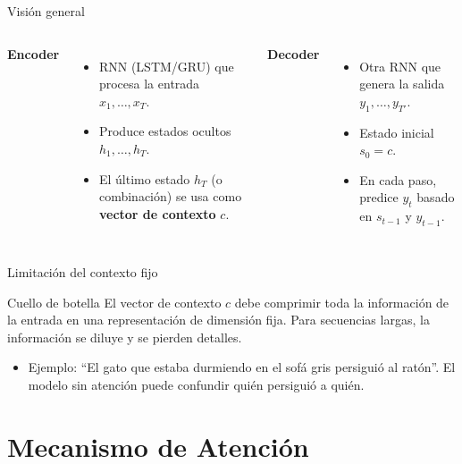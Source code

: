 \documentclass[aspectratio=169, 10pt, xcolor=table]{beamer}
\begin{document}
\begin{frame}{Visión general}
    \begin{columns}[t]
        \textbf{Encoder}
        \begin{itemize}
            \item RNN (LSTM/GRU) que procesa la entrada $x_1,\dots,x_T$.
            \item Produce estados ocultos $h_1,\dots,h_T$.
            \item El último estado $h_T$ (o combinación) se usa como \textbf{vector de contexto} $c$.
        \end{itemize}
        \textbf{Decoder}
        \begin{itemize}
            \item Otra RNN que genera la salida $y_1,\dots,y_{T'}$.
            \item Estado inicial $s_0 = c$.
            \item En cada paso, predice $y_t$ basado en $s_{t-1}$ y $y_{t-1}$.
        \end{itemize}
    \end{columns}
\end{frame}

\begin{frame}{Limitación del contexto fijo}
    \begin{alertblock}{Cuello de botella}
        El vector de contexto $c$ debe comprimir toda la información de la entrada en una representación de dimensión fija. Para secuencias largas, la información se diluye y se pierden detalles.
    \end{alertblock}
    \begin{itemize}
        \item Ejemplo: ``El gato que estaba durmiendo en el sofá gris persiguió al ratón''. El modelo sin atención puede confundir quién persiguió a quién.
    \end{itemize}
\end{frame}

\section{Mecanismo de Atención}
\end{document}
